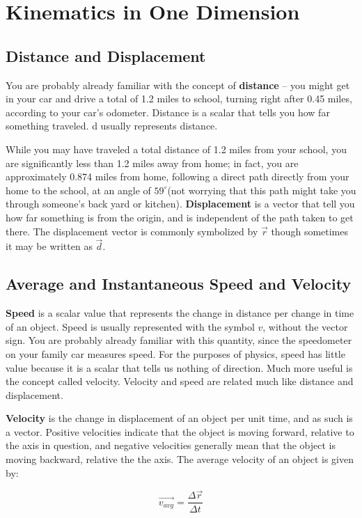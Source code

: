 \chapter{Kinematics in One Dimension}
\section{Distance and Displacement}
You are probably already familiar with the concept of \textbf{distance} – you might get in your car and drive a total of 1.2 miles to school, turning right after 0.45 miles, according to your car's odometer.  Distance is a scalar that tells you how far something traveled.  d usually represents distance.

While you may have traveled a total distance of 1.2 miles from your school, you are significantly less than 1.2 miles away from home; in fact, you are approximately 0.874 miles from home, following a direct path directly from your home to the school, at an angle of $59^\circ $(not worrying that this path might take you through someone's back yard or kitchen).  \textbf{Displacement} is a vector that tell you how far something is from the origin, and is independent of the path taken to get there.  The displacement vector is commonly symbolized by $\vec{r}$ though sometimes it may be written as $\vec{d}$. 

\section{Average and Instantaneous Speed and Velocity}

\textbf{Speed} is a scalar value that represents the change in distance per change in time of an object.  Speed is usually represented with the symbol $v$, without the vector sign.  You are probably already familiar with this quantity, since the speedometer on your family car measures speed.  For the purposes of physics, speed has little value because it is a scalar that tells us nothing of direction.  Much more useful is the concept called velocity.  Velocity and speed are related much like distance and displacement.  

\textbf{Velocity} is the change in displacement of an object per unit time, and as such is a vector.  Positive velocities indicate that the object is moving forward, relative to the axis in question, and negative velocities generally mean that the object is moving backward, relative the the axis.  The average velocity of an object is given by:
\begin{center}
	\begin{equation}
	\overrightarrow{v_{avg}} = \frac{\Delta\vec{r}}{\Delta t}
	\end{equation}
\end{center}

